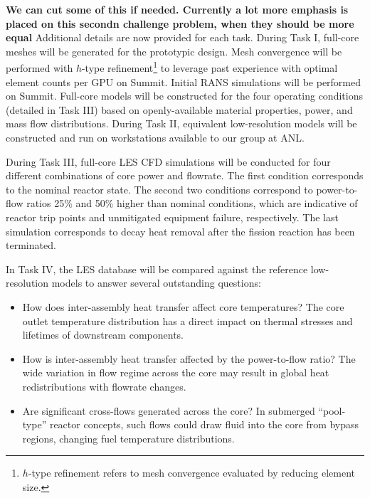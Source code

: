 {\bf We can cut some of this if needed. Currently a lot more emphasis is placed on this secondn challenge problem, when they should be more equal}
Additional details are now provided for each task. During Task I, full-core meshes will be generated for the prototypic design. Mesh convergence will be performed with \(h\)-type refinement\footnote{$h$-type refinement refers to mesh convergence evaluated by reducing element size.} to leverage past experience with optimal element counts per GPU on Summit. Initial RANS simulations will be performed on Summit.  Full-core models will be constructed for the four operating conditions (detailed in Task III) based on openly-available material properties, power, and mass flow distributions. During Task II, equivalent low-resolution models will be constructed and run on workstations available to our group at ANL.

During Task III, full-core LES CFD simulations will be conducted for four different combinations of core power and flowrate. The first condition corresponds to the nominal reactor state. The second two conditions correspond to power-to-flow ratios 25\% and 50\% higher than nominal conditions, which are indicative of reactor trip points \cite{chaumont} and unmitigated equipment failure, respectively. The last simulation corresponds to decay heat removal after the fission reaction has been terminated.

In Task IV, the LES database will be compared against the reference low-resolution models to answer several outstanding questions:

\vspace{-.15in}
\begin{itemize}
\item How does inter-assembly heat transfer affect core temperatures? The core outlet temperature distribution has a direct impact on thermal stresses and lifetimes of downstream components.
\item How is inter-assembly heat transfer affected by the power-to-flow ratio? The wide variation in flow regime across the core may result in global heat redistributions with flowrate changes.
\item Are significant cross-flows generated across the core? In submerged ``pool-type'' reactor concepts, such flows could draw fluid into the core from bypass regions, changing fuel temperature distributions.
\end{itemize}
\vspace{-.15in}

